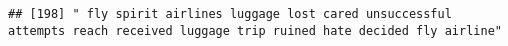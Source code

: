 \documentclass[
]{article}
\begin{document}
\begin{verbatim}
## [198] " fly spirit airlines luggage lost cared unsuccessful attempts reach received luggage trip ruined hate decided fly airline"                                                                                                                                                                                                                                                                                                                                                                                                                                                                                                                                                                                                                                                                                                                                                                                                                                                                                                                                                                                                                                                                                                                                                                                                                                                                                                                                                                                                                                                                                                                                                                                                                                                                     

\end{verbatim}
\end{document}
